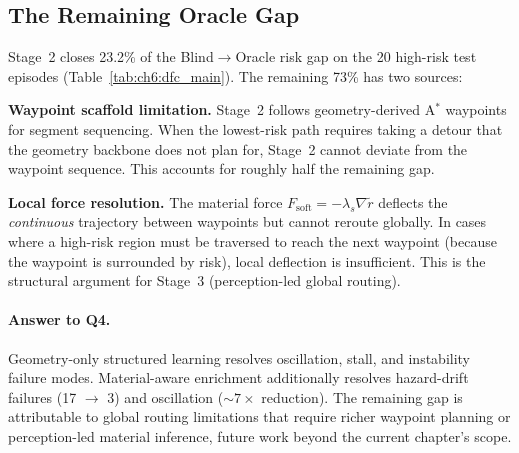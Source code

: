 

\subsection{The Remaining Oracle Gap}
\label{subsec:ch6:oracle_gap}

Stage~2 closes 23.2\% of the Blind$\to$Oracle risk gap on the 20 high-risk test episodes (Table~\ref{tab:ch6:dfc_main}).
The remaining 73\% has two sources:

\textbf{Waypoint scaffold limitation.}
Stage~2 follows geometry-derived A$^*$ waypoints for segment sequencing.
When the lowest-risk path requires taking a detour that the geometry
backbone does not plan for, Stage~2 cannot deviate from the waypoint
sequence.
This accounts for roughly half the remaining gap.

\textbf{Local force resolution.}
The material force $F_{\mathrm{soft}} = -\lambda_s\nabla\tilde{r}$
deflects the \emph{continuous} trajectory between waypoints but cannot
reroute globally.
In cases where a high-risk region must be traversed to reach the next
waypoint (because the waypoint is surrounded by risk), local deflection
is insufficient.
This is the structural argument for Stage~3 (perception-led global
routing).

\paragraph{Answer to Q4.}
Geometry-only structured learning resolves oscillation, stall, and
instability failure modes.
Material-aware enrichment additionally resolves hazard-drift failures
(17 $\to$ 3) and oscillation ($\sim7\times$ reduction).
The remaining gap is attributable to global routing limitations that
require richer waypoint planning or perception-led material inference,
future work beyond the current chapter's scope.

